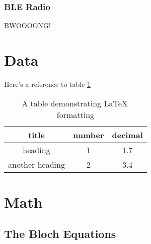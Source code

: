 \documentclass{workreport}
\begin{document}
\begin{body}
	\lipsum[1]

\subsubsection{BLE Radio}

	\lipsum[1]

	BWOOOONG!

\section{Data}

	\lipsum[1-2]

Here's a reference to table \ref{tbl:exampletable}

\begin{table}

	\centering

	\begin{tabular}{|c|c|c|} \hline
		title & number & decimal \\ \hline
		heading & 1 & 1.7 \\ \hline
		another heading & 2 & 3.4 \\ \hline
	\end{tabular}
	\caption{A table demonstrating \LaTeX \, formatting}

	\label{tbl:exampletable}

\end{table}

\section{Math}

	\lipsum[1]

\subsection{The Bloch Equations}


\end{body}
\end{document}
